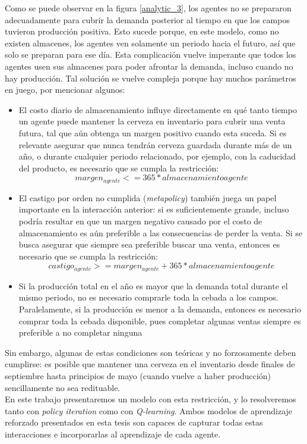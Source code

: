 Como se puede observar en la figura \ref{analytic_3}, los agentes no se prepararon adecuadamente para cubrir la demanda posterior al tiempo en que los campos tuvieron producci\'on positiva. Esto sucede porque, en este modelo, como no existen almacenes, los agentes ven solamente un periodo hacia el futuro, as\'i que solo se preparan para ese d\'ia. Esta complicaci\'on vuelve imperante que todos los agentes usen sus almacenes para poder afrontar la demanda, incluso cuando no hay producci\'on. Tal soluci\'on se vuelve compleja porque hay muchos par\'ametros en juego, por mencionar algunos:
\begin{itemize}
    \item El costo diario de almacenamiento influye directamente en qu\'e tanto tiempo un agente puede mantener la cerveza en inventario para cubrir una venta futura, tal que a\'un obtenga un margen positivo cuando esta suceda. Si es relevante asegurar que nunca tendr\'an cerveza guardada durante m\'as de un a\~no, o durante cualquier periodo relacionado, por ejemplo, con la caducidad del producto, es necesario que se cumpla la restricci\'on:
    $$
    margen_{agente} <= 365*almacenamiento{agente}
    $$
    \item El castigo por orden no cumplida (\textit{metapolicy}) tambi\'en juega un papel importante en la interacci\'on anterior: si es suficientemente grande, incluso podr\'ia resultar en que un margen negativo causado por el costo de almacenamiento es a\'un preferible a las consecuencias de perder la venta. Si se busca asegurar que siempre sea preferible buscar una venta, entonces es necesario que se cumpla la restricci\'on:
    $$
    castigo_{agente} >= margen_{agente} + 365*almacenamiento{agente}
    $$
    \item Si la producci\'on total en el a\~no es mayor que la demanda total durante el mismo periodo, no es necesario comprarle toda la cebada a los campos. Paralelamente, si la producci\'on es menor a la demanda, entonces es necesario comprar toda la cebada disponible, pues completar algunas ventas siempre es preferible a no completar ninguna
\end{itemize}

Sin embargo, algunas de estas condiciones son te\'oricas y no forzosamente deben cumplirse: es posible que mantener una cerveza en el inventario desde finales de septiembre hasta principios de mayo (cuando vuelve a haber producci\'on) sencillamente no sea redituable. \\

En este trabajo presentaremos un modelo con esta restricci\'on, y lo resolveremos tanto con \textit{policy iteration} como con \textit{Q-learning}. Ambos modelos de aprendizaje reforzado presentados en esta tesis son capaces de capturar todas estas interacciones e incorporarlas al aprendizaje de cada agente.
